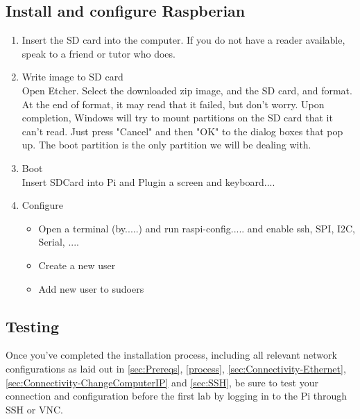 \subsection{Install and configure Raspberian}
\begin{enumerate}
    \item Insert the SD card into the computer. If you do not have a reader available, speak to a friend or tutor who does.
    \item Write image to SD card\\
        Open Etcher. Select the downloaded zip image, and the SD card, and format. At the end of format, it may read that it failed,  but don't worry. Upon completion, Windows will try to mount partitions on the SD card that it can't read. Just press "Cancel" and then "OK" to the dialog boxes that pop up. The boot partition is the only partition we will be dealing with.
    \item Boot\\
    Insert SDCard into Pi and Plugin a screen and keyboard....
    \item Configure\\
    \begin{itemize}
        \item Open a terminal (by.....) and run raspi-config..... and enable ssh, SPI, I2C, Serial, ....
        \item Create a new user 
        \item Add new user to sudoers
    \end{itemize}
\end{enumerate}


\subsection{Testing}
Once you've completed the installation process, including all relevant network configurations as laid out in \ref{sec:Prereqs}, \ref{process}, \ref{sec:Connectivity-Ethernet}, \ref{sec:Connectivity-ChangeComputerIP} and \ref{sec:SSH}, be sure to test your connection and configuration before the first lab by logging in to the Pi through SSH or VNC.